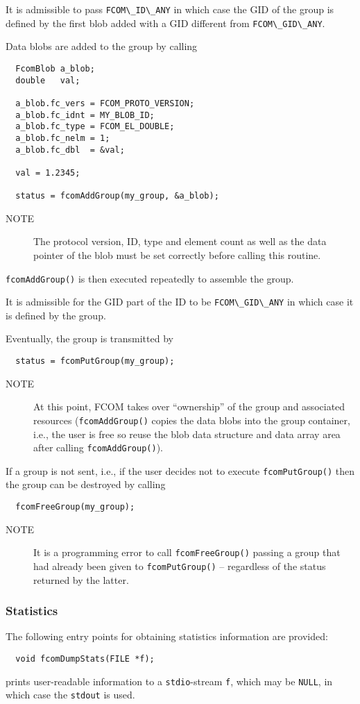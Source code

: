 \documentclass[11pt]{article}
\newcommand{\fcom}{FCOM}
\newcommand{\blob}{blob}
\newcommand{\group}{group}
\newcommand{\cstl}[1]{{\lstinline+#1+}}
\newcommand{\note}[1]{
	\begin{description}
		\item[NOTE] #1
	\end{description}
}
\begin{document}
      It is admissible to pass \cstl{FCOM\_ID\_ANY} in which
      case the GID of the group is defined by the first
	  blob added with a GID different from \cstl{FCOM\_GID\_ANY}.

      Data \blob{}s are added to the group by calling
      \begin{verbatim}
  FcomBlob a_blob;
  double   val;

  a_blob.fc_vers = FCOM_PROTO_VERSION;
  a_blob.fc_idnt = MY_BLOB_ID; 
  a_blob.fc_type = FCOM_EL_DOUBLE;
  a_blob.fc_nelm = 1;
  a_blob.fc_dbl  = &val;
  
  val = 1.2345;

  status = fcomAddGroup(my_group, &a_blob);
      \end{verbatim}
      \note{The protocol version, ID, type and element
      count as well as the data pointer of the \blob{}
      must be set correctly before calling this routine.}
      {\tt fcomAddGroup()} is then executed repeatedly
      to assemble the \group{}.

      It is admissible for the GID part of the ID to
      be \cstl{FCOM\_GID\_ANY} in which case it is defined
      by the group.

      Eventually, the \group{} is transmitted by
      \begin{verbatim}
  status = fcomPutGroup(my_group);
      \end{verbatim}
      \note{At this point, \fcom{} takes over 
      ``ownership'' of the group and associated resources
      ({\tt fcomAddGroup()} copies the data \blob{}s
      into the \group{} container, i.e., the user is
      free so reuse the \blob{} data structure and data 
      array area after calling {\tt fcomAddGroup()}).}

      If a \group{} is not sent, i.e., if the
      user decides not to execute {\tt fcomPutGroup()}
      then the \group{} can be destroyed by
      calling
      \begin{verbatim}
  fcomFreeGroup(my_group);
      \end{verbatim}
      \note{It is a programming error to call {\tt fcomFreeGroup()}
            passing a \group{} that had already been given to
            {\tt fcomPutGroup()} -- regardless of the status
            returned by the latter.}
    \subsubsection{Statistics}
      The following entry points for obtaining statistics information are
      provided:
      \begin{verbatim}
  void fcomDumpStats(FILE *f);
      \end{verbatim}
      prints user-readable information to a \cstl{stdio}-stream
      \cstl{f}, which may be \cstl{NULL}, in which case
      the \cstl{stdout} is used.
\end{document}
